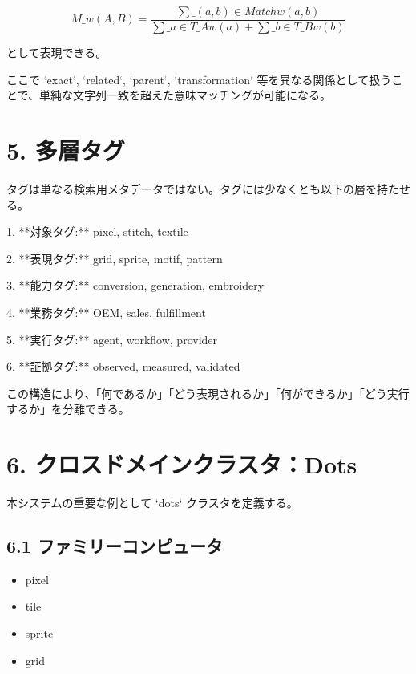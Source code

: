 \documentclass[a4paper,11pt]{jsarticle}
\begin{document}
\[


M\_w(A,B)=


\frac{\sum\_{(a,b)\in Match} w(a,b)}


{\sum\_{a\in T\_A}w(a)+\sum\_{b\in T\_B}w(b)}


\]


として表現できる。


ここで `exact`, `related`, `parent`, `transformation` 等を異なる関係として扱うことで、単純な文字列一致を超えた意味マッチングが可能になる。


\section{5. 多層タグ}
タグは単なる検索用メタデータではない。タグには少なくとも以下の層を持たせる。


1. **対象タグ:** pixel, stitch, textile


2. **表現タグ:** grid, sprite, motif, pattern


3. **能力タグ:** conversion, generation, embroidery


4. **業務タグ:** OEM, sales, fulfillment


5. **実行タグ:** agent, workflow, provider


6. **証拠タグ:** observed, measured, validated


この構造により、「何であるか」「どう表現されるか」「何ができるか」「どう実行するか」を分離できる。


\section{6. クロスドメインクラスタ：Dots}
本システムの重要な例として `dots` クラスタを定義する。


\subsection{6.1 ファミリーコンピュータ}
\begin{itemize}
\item pixel
\end{itemize}
\begin{itemize}
\item tile
\end{itemize}
\begin{itemize}
\item sprite
\end{itemize}
\begin{itemize}
\item grid
\end{itemize}
\end{document}
